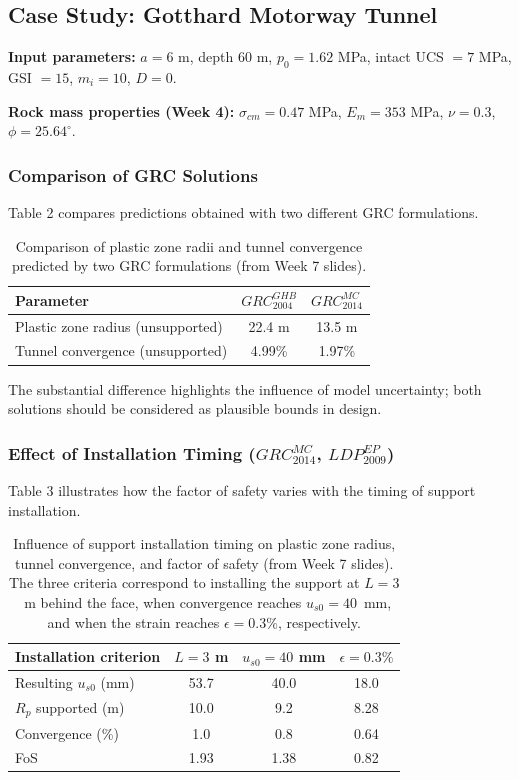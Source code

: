 \documentclass[a4paper,12pt]{article}
\begin{document}
\subsection{Case Study: Gotthard Motorway Tunnel}
\textbf{Input parameters:} $a = 6$ m, depth $60$ m, $p_0 = 1.62$ MPa, intact UCS $= 7$ MPa, GSI $= 15$, $m_i = 10$, $D = 0$.

\textbf{Rock mass properties (Week 4):} $\sigma_{cm} = 0.47$ MPa, $E_m = 353$ MPa, $\nu = 0.3$, $\phi = 25.64^\circ$.

\subsubsection{Comparison of GRC Solutions}
Table 2 compares predictions obtained with two different GRC formulations.

\begin{table}[h!]
\centering
\begin{tabular}{lcc}
\toprule
\textbf{Parameter} & \textbf{$GRC_{2004}^{GHB}$} & \textbf{$GRC_{2014}^{MC}$} \\
\midrule
Plastic zone radius (unsupported) & 22.4 m & 13.5 m \\
Tunnel convergence (unsupported) & 4.99\% & 1.97\% \\
\bottomrule
\end{tabular}
\caption{Comparison of plastic zone radii and tunnel convergence predicted by two GRC formulations (from Week 7 slides).}
\end{table}

The substantial difference highlights the influence of model uncertainty; both solutions should be considered as plausible bounds in design.

\subsubsection{Effect of Installation Timing ($GRC_{2014}^{MC}$, $LDP_{2009}^{EP}$)}
Table 3 illustrates how the factor of safety varies with the timing of support installation.

\begin{table}[h!]
\centering
\begin{tabular}{lccc}
\toprule
\textbf{Installation criterion} & $L = 3$ m & $u_{s0} = 40$ mm & $\epsilon = 0.3\%$ \\
\midrule
Resulting $u_{s0}$ (mm) & 53.7 & 40.0 & 18.0 \\
$R_p$ supported (m) & 10.0 & 9.2 & 8.28 \\
Convergence (\%) & 1.0 & 0.8 & 0.64 \\
FoS & 1.93 & 1.38 & 0.82 \\
\bottomrule
\end{tabular}
\caption{Influence of support installation timing on plastic zone radius, tunnel convergence, and factor of safety (from Week 7 slides). The three criteria correspond to installing the support at $L=3$~m behind the face, when convergence reaches $u_{s0}=40$~mm, and when the strain reaches $\epsilon=0.3\%$, respectively.}
\end{table}
\end{document}
